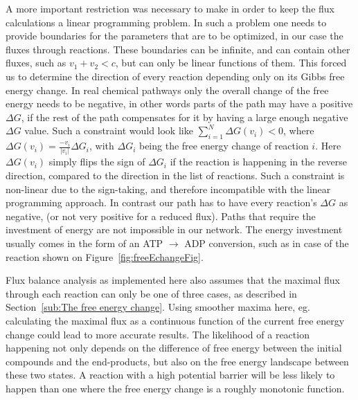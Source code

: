 \documentclass[a4paper,12pt]{article}
\begin{document}
A more important restriction was necessary to make in order to keep the flux calculations a linear programming problem. In such a problem one needs to provide boundaries for the parameters that are to be optimized, in our case the fluxes through reactions. These boundaries can be infinite, and can contain other fluxes, such as $v_1+v_2 < c$, but can only be linear functions of them. This forced us to determine the direction of every reaction depending only on its Gibbs free energy change. In real chemical pathways only the overall change of the free energy needs to be negative, in other words parts of the path may have a positive $\Delta G$, if the rest of the path compensates for it by having a large enough negative $\Delta G$ value. Such a constraint would look like $\sum_{i=1}^N \Delta G \left( v_i \right)<0$, where $\Delta G \left( v_i \right)=\frac{-v_i}{|v_i|} \Delta G_i$, with $\Delta G_i$ being the free energy change of reaction $i$. Here $\Delta G \left( v_i \right)$ simply flips the sign of $\Delta G_i$ if the reaction is happening in the reverse direction, compared to the direction in the list of reactions. Such a constraint is non-linear due to the sign-taking, and therefore incompatible with the linear programming approach. In contrast our path has to have every reaction's $\Delta G$ as negative, (or not very positive for a reduced flux).
Paths that require the investment of energy are not impossible in our network. The energy investment usually comes in the form of an ATP $\rightarrow$ ADP conversion, such as in case of the reaction shown on Figure~\ref{fig:freeEchangeFig}. 

Flux balance analysis as implemented here also assumes that the maximal flux through each reaction can only be one of three cases, as described in Section~\ref{sub:The free energy change}. Using smoother maxima here, eg. calculating the maximal flux as a continuous function of the current free energy change could lead to more accurate results. The likelihood of a reaction happening not only depends on the difference of free energy between the initial compounds and the end-products, but also on the free energy landscape between these two states. A reaction with a high potential barrier will be less likely to happen than one where the free energy change is a roughly monotonic function. 


\end{document}
